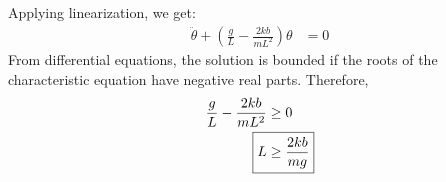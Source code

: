 \subsection{}
Applying linearization, we get:
\begin{align*}
    \ddot{\theta} + \left(\frac{g}{L} - \frac{2kb}{mL^2}\right) \theta &= 0
\end{align*}
From differential equations, the solution is bounded if the roots of the characteristic equation have negative real parts. Therefore,
\begin{align*}
    \frac{g}{L} - \frac{2kb}{mL^2} &\geq 0 \\
    \Aboxed{L &\geq \frac{2kb}{mg}}
\end{align*}